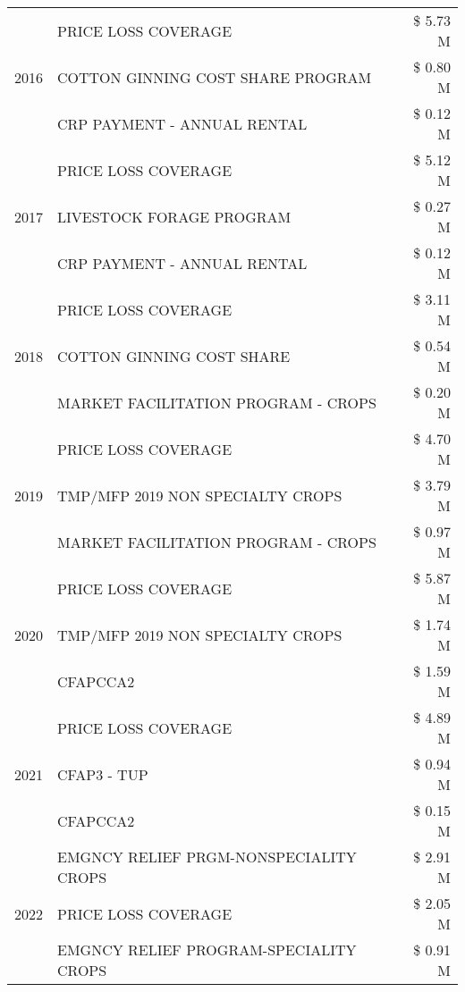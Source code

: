 \begin{tabular}{llr}
\cline{1-3}
\multirow[t]{3}{*}{2016} & PRICE LOSS COVERAGE & \$ 5.73 M \\
 & COTTON GINNING COST SHARE PROGRAM & \$ 0.80 M \\
 & CRP PAYMENT - ANNUAL RENTAL & \$ 0.12 M \\
\cline{1-3}
\multirow[t]{3}{*}{2017} & PRICE LOSS COVERAGE & \$ 5.12 M \\
 & LIVESTOCK FORAGE PROGRAM & \$ 0.27 M \\
 & CRP PAYMENT - ANNUAL RENTAL & \$ 0.12 M \\
\cline{1-3}
\multirow[t]{3}{*}{2018} & PRICE LOSS COVERAGE & \$ 3.11 M \\
 & COTTON GINNING COST SHARE & \$ 0.54 M \\
 & MARKET FACILITATION PROGRAM - CROPS & \$ 0.20 M \\
\cline{1-3}
\multirow[t]{3}{*}{2019} & PRICE LOSS COVERAGE & \$ 4.70 M \\
 & TMP/MFP 2019 NON SPECIALTY CROPS & \$ 3.79 M \\
 & MARKET FACILITATION PROGRAM - CROPS & \$ 0.97 M \\
\cline{1-3}
\multirow[t]{3}{*}{2020} & PRICE LOSS COVERAGE & \$ 5.87 M \\
 & TMP/MFP 2019 NON SPECIALTY CROPS & \$ 1.74 M \\
 & CFAPCCA2 & \$ 1.59 M \\
\cline{1-3}
\multirow[t]{3}{*}{2021} & PRICE LOSS COVERAGE & \$ 4.89 M \\
 & CFAP3 - TUP & \$ 0.94 M \\
 & CFAPCCA2 & \$ 0.15 M \\
\cline{1-3}
\multirow[t]{3}{*}{2022} & EMGNCY RELIEF PRGM-NONSPECIALITY CROPS & \$ 2.91 M \\
 & PRICE LOSS COVERAGE & \$ 2.05 M \\
 & EMGNCY RELIEF PROGRAM-SPECIALITY CROPS & \$ 0.91 M \\
\cline{1-3}
\bottomrule
\end{tabular}

